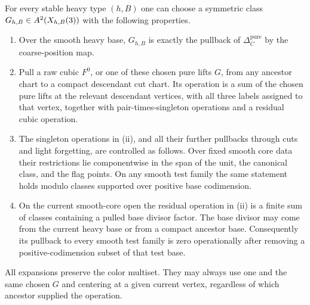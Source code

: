 \begin{proposition}
\label{prop:controlled-lifts}
For every stable heavy type $(h,B)$ one can choose a symmetric class
$G_{h,B}\in A^2(X_{h,B}(3))$ with the following properties.
\begin{enumerate}[label=\textup{(\roman*)}]
\item
Over the smooth heavy base, $G_{h,B}$ is exactly the pullback of
$\Delta_C^{\mathrm{pure}}$ by the coarse-position map.
\item
Pull a raw cubic $F^0$, or one of these chosen pure lifts $G$, from any
ancestor chart to a compact descendant cut chart.  Its operation is
a sum of the chosen pure lifts at the relevant descendant vertices,
with all three labels assigned to that vertex, together with
pair-times-singleton operations and a residual cubic operation.
\item
The singleton operations in \textup{(ii)}, and all their further
pullbacks through cuts and light forgetting, are controlled as
follows.  Over fixed smooth core data their restrictions lie
componentwise in the span of the unit, the canonical class, and the
flag points.  On any smooth test family the same statement holds
modulo classes supported over positive base codimension.
\item
On the current smooth-core open the residual operation in
\textup{(ii)} is a finite sum of classes containing a pulled base
divisor factor.  The base divisor may come from the current heavy
base or from a compact ancestor base.  Consequently its pullback to
every smooth test family is zero operationally after removing a
positive-codimension subset of that test base.
\end{enumerate}
All expansions preserve the color multiset.  They may always use one
and the same chosen $G$ and centering at a given current vertex,
regardless of which ancestor supplied the operation.
\end{proposition}

